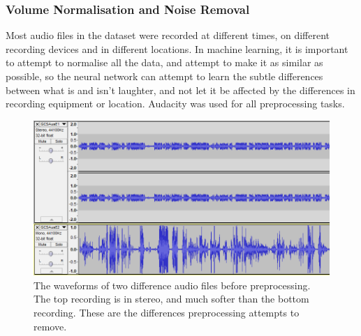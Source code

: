 \documentclass[a4paper,11pt,notitlepage]{article}
\begin{document}
\subsubsection{Volume Normalisation and Noise Removal}

Most audio files in the dataset were recorded at different times, on different recording devices and in different locations. In machine learning, it is important to attempt to normalise all the data, and attempt to make it as similar as possible, so the neural network can attempt to learn the subtle differences between what is and isn't laughter, and not let it be affected by the differences in recording equipment or location. Audacity was used for all preprocessing tasks.

\begin{figure}[H]
	\centering
	\vspace{0.5cm}
	\includegraphics[scale = 0.5]{figs/origional_waveforms.png}
	\caption{The waveforms of two difference audio files before preprocessing. The top recording is in stereo, and much softer than the bottom recording. These are the differences preprocessing attempts to remove.}
	\label{before_preprocessing}
\end{figure}
\end{document}
